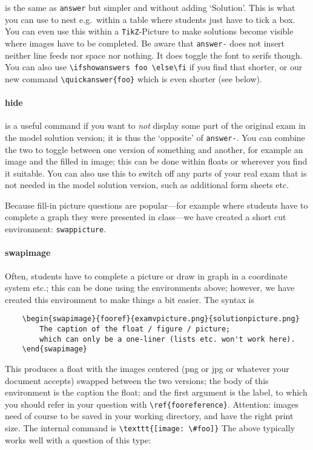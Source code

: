 \documentclass[a4paper]{scrartcl}
\begin{document}
is the same as \verb|answer| but simpler and without adding `Solution'. This is what you can use to nest e.g.\ within a table where students just have to tick a box. You can even use this within a \verb|TikZ|-Picture to make solutions become visible where images have to be completed. Be aware that \verb|answer-| does not insert neither line feeds nor space nor nothing. It does toggle the font to serifs though.  You can also use \verb|\ifshowanswers foo \else\fi| if you find that shorter, or our new command \verb|\quickanswer{foo}| which is even shorter (see below).



\paragraph{hide}

is a useful command if you want to \emph{not} display some part of the original exam in the model solution version; it is thus the `opposite' of  \verb|answer-|.  You can combine the two to toggle between one version of something and another, for example an image and the filled in image; this can be done within floats or wherever you find it suitable. You can also use this to switch off any parts of your real exam that is not needed in the model solution version, such as additional form sheets etc. 

Because fill-in picture questions are popular---for example where students have to complete a graph they were presented in class---we have created a short cut environment: \verb|swappicture|.

\paragraph{swapimage}

Often, students have to complete a picture or draw in graph in a coordinate system etc.; this can be done using the environments above; however, we have created this environment to make things a bit easier. The syntax is

\begin{verbatim}
    \begin{swapimage}{fooref}{examvpicture.png}{solutionpicture.png}
        The caption of the float / figure / picture;
        which can only be a one-liner (lists etc. won't work here).
    \end{swapimage}
\end{verbatim}

This produces a float with the images centered (png or jpg or whatever your document accepts) swapped between the two versions; the body of this environment is the caption the float; and the first argument is the label, to which you should refer in your question with \verb|\ref{fooreference}|. Attention: images need of course to be saved in your working directory, and have the right print size. The internal command is \verb|\texttt{[image: \#foo]}| The above typically works well with a question of this type:
\end{document}
